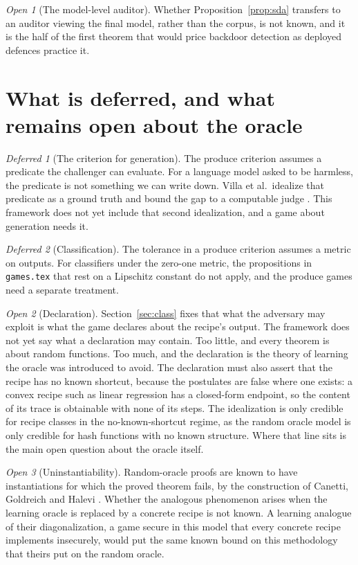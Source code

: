 \documentclass[11pt]{article}
\theoremstyle{definition}
\theoremstyle{plain}
\theoremstyle{remark}
\newtheorem{openq}{Open}
\newtheorem{deferred}{Deferred}
\begin{document}
\begin{openq}[The model-level auditor]
Whether Proposition~\ref{prop:sda} transfers to an auditor viewing the final
model, rather than the corpus, is not known, and it is the half of the first
theorem that would price backdoor detection as deployed defences practice it.
\end{openq}

\section{What is deferred, and what remains open about the oracle}

\begin{deferred}[The criterion for generation]
The produce criterion assumes a predicate the challenger can evaluate. For a
language model asked to be harmless, the predicate is not something we can write
down. Villa et al.\ idealize that predicate as a ground truth and bound the gap to a
computable judge \cite{VDKMR26}. This framework does not yet include that second
idealization, and a game about generation needs it.
\end{deferred}

\begin{deferred}[Classification]
The tolerance in a produce criterion assumes a metric on outputs. For classifiers
under the zero-one metric, the propositions in \texttt{games.tex} that rest on a
Lipschitz constant do not apply, and the produce games need a separate treatment.
\end{deferred}

\begin{openq}[Declaration]
Section~\ref{sec:class} fixes that what the adversary may exploit is what the game
declares about the recipe's output. The framework does not yet say what a
declaration may contain. Too little, and every theorem is about random functions.
Too much, and the declaration is the theory of learning the oracle was introduced
to avoid. The declaration must also assert that the recipe has no known shortcut,
because the postulates are false where one exists: a convex recipe such as linear
regression has a closed-form endpoint, so the content of its trace is obtainable
with none of its steps. The idealization is only credible for recipe classes in
the no-known-shortcut regime, as the random oracle model is only credible for hash
functions with no known structure. Where that line sits is the main open question
about the oracle itself.
\end{openq}

\begin{openq}[Uninstantiability]
Random-oracle proofs are known to have instantiations for which the proved
theorem fails, by the construction of Canetti, Goldreich and Halevi \cite{CGH04}.
Whether the analogous phenomenon arises when the learning oracle is replaced by a
concrete recipe is not known. A learning analogue of their diagonalization, a game
secure in this model that every concrete recipe implements insecurely, would put
the same known bound on this methodology that theirs put on the random oracle.
\end{openq}



\end{document}
